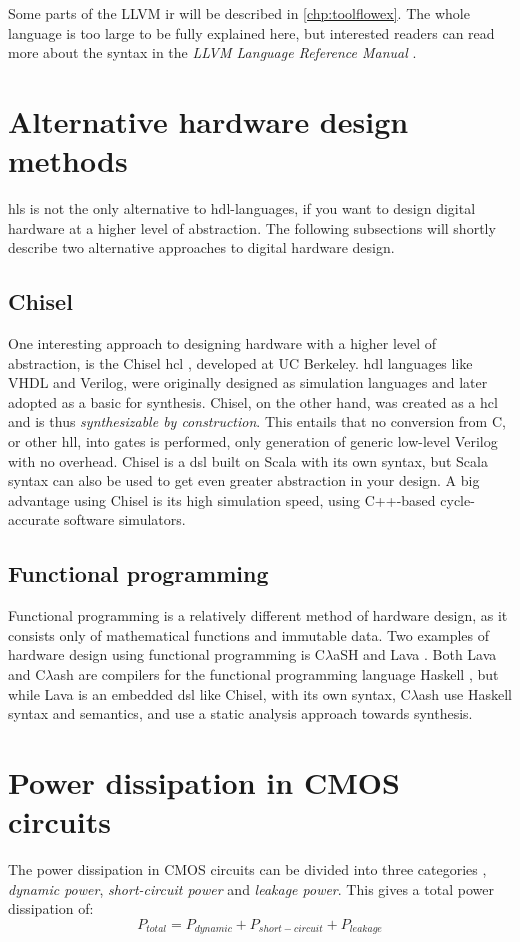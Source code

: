 Some parts of the LLVM \gls{ir} will be described in \cref{chp:toolflowex}. The whole language is too large to be fully explained here, but interested readers can read more about the syntax in the \textit{LLVM Language Reference Manual} \cite{llvmlangman}.

\section{Alternative hardware design methods}
\gls{hls} is not the only alternative to \gls{hdl}-languages, if you want to design digital hardware at a higher level of abstraction. The following subsections will shortly describe two alternative approaches to digital hardware design. 
\subsection{Chisel}
One interesting approach to designing hardware with a higher level of abstraction, is the Chisel \gls{hcl} \cite{bachrach2012chisel}, developed at UC Berkeley. \gls{hdl} languages like VHDL and Verilog, were originally designed as simulation languages and later adopted as a basic for synthesis. Chisel, on the other hand, was created as a \gls{hcl} and is thus \textit{synthesizable by construction}. This entails that no conversion from C, or other \gls{hll}, into gates is performed, only generation of generic low-level Verilog with no overhead. Chisel is a \gls{dsl} built on Scala \cite{odersky2004overview} with its own syntax, but Scala syntax can also be used to get even greater abstraction in your design. A big advantage using Chisel is its high simulation speed, using C++-based cycle-accurate software simulators.

\subsection{Functional programming}
Functional programming is a relatively different method of hardware design, as it consists only of mathematical functions and immutable data. Two examples of hardware design using functional programming is C$\lambda$aSH \cite{baaij2009clash} and Lava \cite{bjesse1998lava}. Both Lava and C$\lambda$ash are compilers for the functional programming language Haskell \cite{haskellonline}, but while Lava is an embedded \gls{dsl} like Chisel, with its own syntax, C$\lambda$ash use Haskell syntax and semantics, and use a static analysis approach towards synthesis.

\section{\label{sec:powdiss}Power dissipation in CMOS circuits}
The power dissipation in CMOS circuits can be divided into three categories \cite{panda2010power}, \textit{dynamic power}, \textit{short-circuit power} and \textit{leakage power}. This gives a total power dissipation of:
\begin{equation}
    P_{total} = P_{dynamic} + P_{short-circuit} + P_{leakage}
\end{equation}

